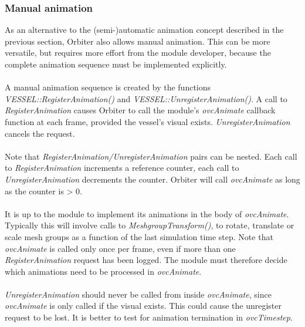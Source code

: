 \documentclass[Orbiter Developer Manual.tex]{subfiles}
\begin{document}
\subsubsection{Manual animation}
As an alternative to the (semi-)automatic animation concept described in the previous section, Orbiter also allows manual animation. This can be more versatile, but requires more effort from the module developer, because the complete animation sequence must be implemented explicitly.\\
\\
A manual animation sequence is created by the functions \textit{VESSEL::RegisterAnimation()} and \textit{VESSEL::UnregisterAnimation()}. A call to \textit{RegisterAnimation} causes Orbiter to call the module's \textit{ovcAnimate} callback function at each frame, provided the vessel's visual exists. \textit{UnregisterAnimation} cancels the request.\\
\\
Note that \textit{RegisterAnimation/UnregisterAnimation} pairs can be nested. Each call to \textit{RegisterAnimation} increments a reference counter, each call to \textit{UnregisterAnimation} decrements the counter. Orbiter will call \textit{ovcAnimate} as long as the counter is > 0.\\
\\
It is up to the module to implement its animations in the body of \textit{ovcAnimate}. Typically this will involve calls to \textit{MeshgroupTransform()}, to rotate, translate or scale mesh groups as a function of the last simulation time step. Note that \textit{ovcAnimate} is called only once per frame, even if more than one \textit{RegisterAnimation} request has been logged. The module must therefore decide which animations need to be processed in \textit{ovcAnimate}.\\
\\
\textit{UnregisterAnimation} should never be called from inside \textit{ovcAnimate}, since \textit{ovcAnimate} is only called if the visual exists. This could cause the unregister request to be lost. It is better to test for animation termination in \textit{ovcTimestep}.
\end{document}
